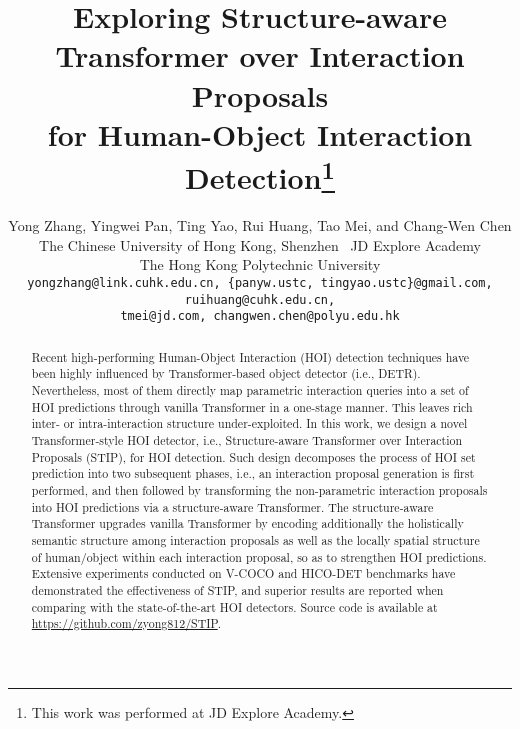 \documentclass[10pt,twocolumn,letterpaper]{article}
\begin{document}
\title{Exploring Structure-aware Transformer over Interaction Proposals\\ for Human-Object Interaction Detection\thanks{{\small This work was performed at JD Explore Academy.}}}

\author{Yong Zhang, Yingwei Pan, Ting Yao, Rui Huang, Tao Mei, and Chang-Wen Chen\\
{\normalsize\centering The Chinese University of Hong Kong, Shenzhen}~
{\normalsize\centering JD Explore Academy}\\
{\normalsize\centering The Hong Kong Polytechnic University}\\
{\tt\small yongzhang@link.cuhk.edu.cn, \{panyw.ustc, tingyao.ustc\}@gmail.com, ruihuang@cuhk.edu.cn,}\\
{\tt\small tmei@jd.com, changwen.chen@polyu.edu.hk}
}

\maketitle


\begin{abstract}
Recent high-performing Human-Object Interaction (HOI) detection techniques have been highly influenced by Transformer-based object detector (i.e., DETR). Nevertheless, most of them directly map parametric interaction queries into a set of HOI predictions through vanilla Transformer in a one-stage manner. This leaves rich inter- or intra-interaction structure under-exploited. In this work, we design a novel Transformer-style HOI detector, i.e., Structure-aware Transformer over Interaction Proposals (STIP), for HOI detection. Such design decomposes the process of HOI set prediction into two subsequent phases, i.e., an interaction proposal generation is first performed, and then followed by transforming the non-parametric interaction proposals into HOI predictions via a structure-aware Transformer. The structure-aware Transformer upgrades vanilla Transformer by encoding additionally the holistically semantic structure among interaction proposals as well as the locally spatial structure of human/object within each interaction proposal, so as to strengthen HOI predictions. Extensive experiments conducted on V-COCO and HICO-DET benchmarks have demonstrated the effectiveness of STIP, and superior results are reported when comparing with the state-of-the-art HOI detectors. Source code is available at \url{https://github.com/zyong812/STIP}.
\end{abstract}
\end{document}
